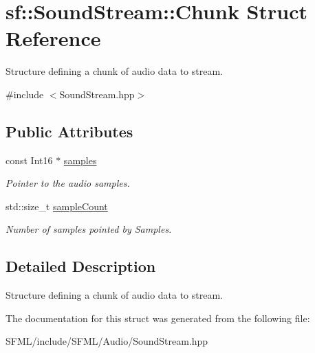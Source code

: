 \hypertarget{structsf_1_1_sound_stream_1_1_chunk}{}\section{sf\+:\+:Sound\+Stream\+:\+:Chunk Struct Reference}
\label{structsf_1_1_sound_stream_1_1_chunk}


Structure defining a chunk of audio data to stream.  




{\ttfamily \#include $<$Sound\+Stream.\+hpp$>$}

\subsection*{Public Attributes}
\begin{DoxyCompactItemize}
\item 
\mbox{\label{structsf_1_1_sound_stream_1_1_chunk_aa3b84d69adbe663a17a7671626076df4}} 
const Int16 $\ast$ \mbox{\hyperlink{structsf_1_1_sound_stream_1_1_chunk_aa3b84d69adbe663a17a7671626076df4}{samples}}
\begin{DoxyCompactList}\small\item\em Pointer to the audio samples. \end{DoxyCompactList}\item 
\mbox{\label{structsf_1_1_sound_stream_1_1_chunk_af47f5d94012acf8b11f056ba77aff97a}} 
std\+::size\+\_\+t \mbox{\hyperlink{structsf_1_1_sound_stream_1_1_chunk_af47f5d94012acf8b11f056ba77aff97a}{sample\+Count}}
\begin{DoxyCompactList}\small\item\em Number of samples pointed by Samples. \end{DoxyCompactList}\end{DoxyCompactItemize}


\subsection{Detailed Description}
Structure defining a chunk of audio data to stream. 

\begin{DoxyVerb}\end{DoxyVerb}
 

The documentation for this struct was generated from the following file\+:\begin{DoxyCompactItemize}
\item 
S\+F\+M\+L/include/\+S\+F\+M\+L/\+Audio/Sound\+Stream.\+hpp\end{DoxyCompactItemize}
